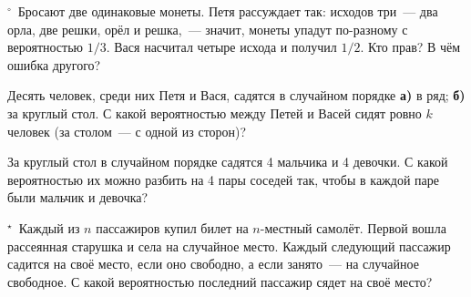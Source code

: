 \zp \unskip$^{\circ}$\ Бросают две одинаковые монеты. Петя рассуждает так: исходов три~— два орла, две решки, орёл и решка,~— значит, монеты упадут по-разному с вероятностью $1/3$. Вася насчитал четыре исхода и получил $1/2$. Кто прав? В чём ошибка другого?

\zp Десять человек, среди них Петя и Вася, садятся в случайном порядке \textbf{а)} в ряд; \textbf{б)} за круглый стол. С какой вероятностью между Петей и Васей сидят ровно $k$ человек (за столом~— с одной из сторон)?

\zp За круглый стол в случайном порядке садятся 4 мальчика и 4 девочки. С какой вероятностью их можно разбить на 4 пары соседей так, чтобы в каждой паре были мальчик и девочка?

\zp \unskip$^{\star}$\ Каждый из $n$ пассажиров купил билет на $n$-местный самолёт. Первой вошла рассеянная старушка и села на случайное место. Каждый следующий пассажир садится на своё место, если оно свободно, а если занято~— на случайное свободное. С какой вероятностью последний пассажир сядет на своё место?
